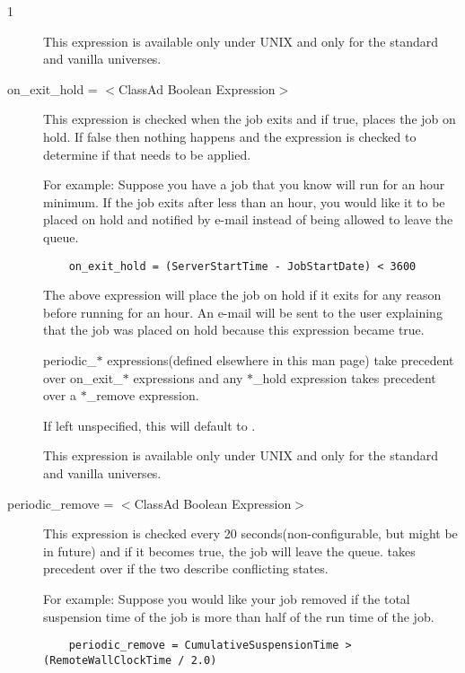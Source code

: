\begin{ManPage}{\label{man-condor-submit}}{1}
\begin{description}
This expression is available only under UNIX and only for the standard and 
vanilla universes.


\item[on\_exit\_hold = $<$ClassAd Boolean Expression$>$] This expression
is checked when the job exits and if true, places the job on hold. If false
then nothing happens and the  expression is
checked to determine if that needs to be applied.

For example:
Suppose you have a job that you know will run for an hour minimum. If
the job exits after less than an hour, you would like it to be placed on
hold and notified by e-mail instead of being allowed to leave the queue.

\begin{verbatim}
	on_exit_hold = (ServerStartTime - JobStartDate) < 3600
\end{verbatim}

The above expression will place the job on hold if it exits for any reason
before running for an hour. An e-mail will be sent to the user explaining
that the job was placed on hold because this expression became true.

periodic\_$*$ expressions(defined elsewhere in this man page) take
precedent over on\_exit\_$*$ expressions and any $*$\_hold expression takes
precedent over a $*$\_remove expression.

If left unspecified, this will default to .

This expression is available only under UNIX and only for the standard and 
vanilla universes.


\item[periodic\_remove = $<$ClassAd Boolean Expression$>$]
This expression is checked every 20 seconds(non-configurable,
but might be in future) and if it becomes true, the job will
leave the queue.  takes precedent over
 if the two describe conflicting states.

For example:
Suppose you would like your job removed if the total suspension time of the
job is more than half of the run time of the job.

\begin{verbatim}
	periodic_remove = CumulativeSuspensionTime > (RemoteWallClockTime / 2.0)
\end{verbatim}


\end{description}
\end{ManPage}
